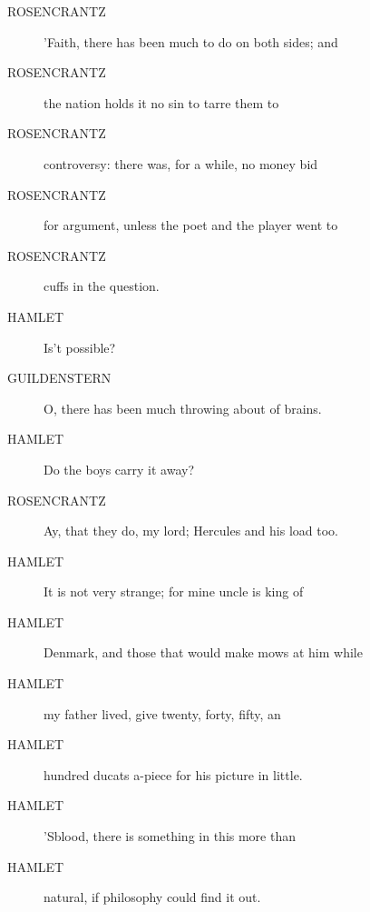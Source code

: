\documentclass{article}
\begin{document}
\begin{description}
            
\item[ROSENCRANTZ] 'Faith, there has been much to do on both sides; and
\item[ROSENCRANTZ] the nation holds it no sin to tarre them to
\item[ROSENCRANTZ] controversy: there was, for a while, no money bid
\item[ROSENCRANTZ] for argument, unless the poet and the player went to
\item[ROSENCRANTZ] cuffs in the question.
\end{description}
          
\begin{description}
            
\item[HAMLET] Is't possible?
\end{description}
          
\begin{description}
            
\item[GUILDENSTERN] O, there has been much throwing about of brains.
\end{description}
          
\begin{description}
            
\item[HAMLET] Do the boys carry it away?
\end{description}
          
\begin{description}
            
\item[ROSENCRANTZ] Ay, that they do, my lord; Hercules and his load too.
\end{description}
          
\begin{description}
            
\item[HAMLET] It is not very strange; for mine uncle is king of
\item[HAMLET] Denmark, and those that would make mows at him while
\item[HAMLET] my father lived, give twenty, forty, fifty, an
\item[HAMLET] hundred ducats a-piece for his picture in little.
\item[HAMLET] 'Sblood, there is something in this more than
\item[HAMLET] natural, if philosophy could find it out.
\end{description}
          
\end{document}
